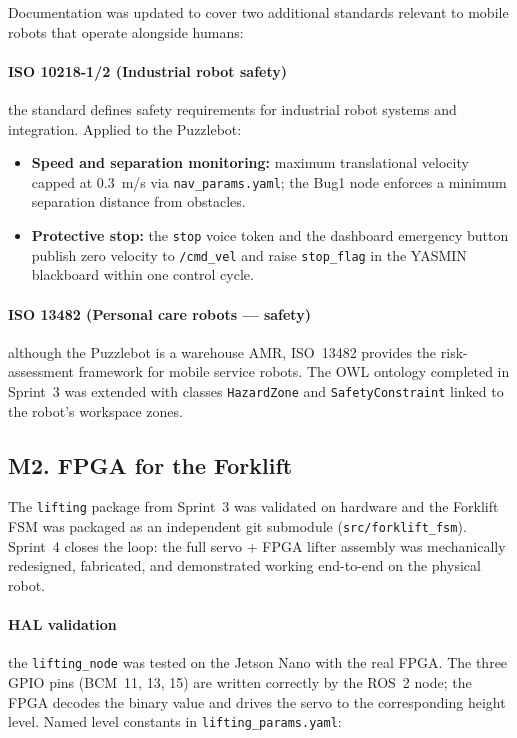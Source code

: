 \documentclass[conference]{IEEEtran}
\begin{document}
Documentation was updated to cover two additional standards relevant to
mobile robots that operate alongside humans:

\paragraph{ISO 10218-1/2 (Industrial robot safety)} the standard defines
safety requirements for industrial robot systems and integration. Applied to
the Puzzlebot:
\begin{itemize}[noitemsep, leftmargin=*]
  \item \textbf{Speed and separation monitoring:} maximum translational
        velocity capped at 0.3~m/s via \texttt{nav\_params.yaml}; the
        Bug1 node enforces a minimum separation distance from obstacles.
  \item \textbf{Protective stop:} the \texttt{stop} voice token and the
        dashboard emergency button publish zero velocity to \texttt{/cmd\_vel}
        and raise \texttt{stop\_flag} in the YASMIN blackboard within one
        control cycle.
\end{itemize}

\paragraph{ISO 13482 (Personal care robots — safety)} although the Puzzlebot
is a warehouse AMR, ISO~13482 provides the risk-assessment framework for
mobile service robots. The OWL ontology completed in Sprint~3 was extended
with classes \texttt{HazardZone} and \texttt{SafetyConstraint} linked to the
robot's workspace zones.

\subsection{M2. FPGA for the Forklift }

The \texttt{lifting} package from Sprint~3 was validated on hardware and the
Forklift FSM was packaged as an independent git submodule
(\texttt{src/forklift\_fsm}). Sprint~4 closes the loop: the full
servo + FPGA lifter assembly was mechanically redesigned, fabricated, and
demonstrated working end-to-end on the physical robot.

\paragraph{HAL validation} the \texttt{lifting\_node} was tested on the
Jetson Nano with the real FPGA. The three GPIO pins (BCM~11, 13, 15) are
written correctly by the ROS~2 node; the FPGA decodes the binary value and
drives the servo to the corresponding height level. Named level constants
in \texttt{lifting\_params.yaml}:
\end{document}
